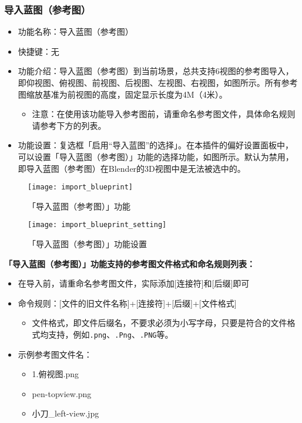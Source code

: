 \documentclass{../../public_resources/doc}
\begin{document}
\subsubsection{导入蓝图（参考图）}
\begin{itemize}
    \item 功能名称：导入蓝图（参考图）
    \item 快捷键：无
    \item 功能介绍：导入蓝图（参考图）到当前场景，总共支持6视图的参考图导入，即仰视图、俯视图、前视图、后视图、左视图、右视图，如图所示。所有参考图缩放基准为前视图的高度，固定显示长度为4M（4米）。
    \begin{itemize}
        \item 注意：在使用该功能导入参考图前，请重命名参考图文件，具体命名规则请参考下方的列表。
    \end{itemize}
    \item 功能设置：复选框「启用“导入蓝图”的选择」。在本插件的偏好设置面板中，可以设置「导入蓝图（参考图）」功能的选择功能，如图所示。默认为禁用，即导入蓝图（参考图）在Blender的3D视图中是无法被选中的。
\end{itemize}

\begin{figure}[h!]
    \begin{minipage}[t]{0.48\linewidth}
        \texttt{[image: import\_blueprint]}
        \caption{「导入蓝图（参考图）」功能}
        \label{「导入蓝图（参考图）」功能}
    \end{minipage}
    \quad
    \begin{minipage}[t]{0.48\linewidth}
        \texttt{[image: import\_blueprint\_setting]}
        \caption{「导入蓝图（参考图）」功能设置}
        \label{「导入蓝图（参考图）」功能设置}
    \end{minipage}
\end{figure}

\noindent \textbf{「导入蓝图（参考图）」功能支持的参考图文件格式和命名规则列表：}
\begin{itemize}
    \item 在导入前，请重命名参考图文件，实际添加[连接符]和[后缀]即可
    \item 命令规则：[文件的旧文件名称]+[连接符]+[后缀]+[文件格式]
    \begin{itemize}
        \item 文件格式，即文件后缀名，不要求必须为小写字母，只要是符合的文件格式均支持，例如\lstinline|.png|、\lstinline|.Png|、\lstinline|.PNG|等。
    \end{itemize}
    \item 示例参考图文件名：
    \begin{itemize}
        \item 1.俯视图.png
        \item pen-topview.png
        \item 小刀\_left-view.jpg
    \end{itemize}
\end{itemize}
\end{document}
